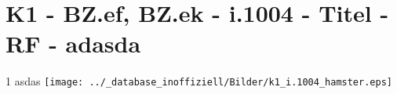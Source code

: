 \section{K1 - BZ.ef, BZ.ek - i.1004 - Titel - RF - adasda}

\begin{langesbeispiel}\item[1] %
asdas \texttt{[image: ../\_database\_inoffiziell/Bilder/k1\_i.1004\_hamster.eps]}

\end{langesbeispiel}